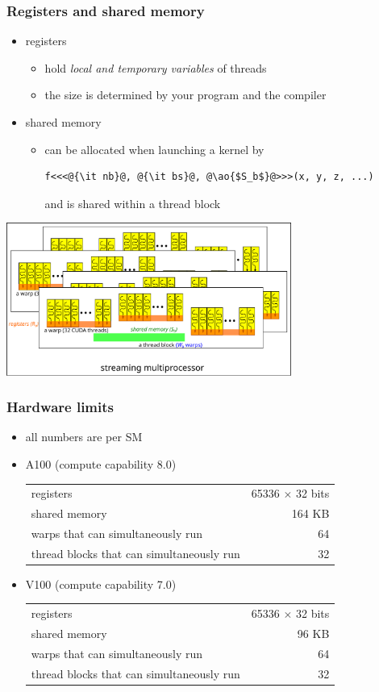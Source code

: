 \documentclass[12pt,dvipdfmx]{beamer}
\newcommand{\ao}[1]{{\color{blue}#1}}
\begin{document}
\begin{frame}[fragile]
  \frametitle{Registers and shared memory}
  \begin{itemize}
  \item registers
    \begin{itemize}
    \item hold \ao{\it local and temporary variables} of threads
    \item the size is determined by your program and the compiler
    \end{itemize}
  \item shared memory
    \begin{itemize}
    \item can be allocated when launching a kernel by
    \begin{lstlisting}
f<<<@{\it nb}@, @{\it bs}@, @\ao{$S_b$}@>>>(x, y, z, ...)
\end{lstlisting}
and is shared within a thread block
    \end{itemize}
  \end{itemize}
  \begin{center}
    \includegraphics[width=0.7\textwidth]{out/pdf/svg/warp_block_sm_5.pdf}
  \end{center}
\end{frame}

\begin{frame}
  \frametitle{Hardware limits}
  \begin{itemize}
  \item all numbers are per SM
  \item A100 (compute capability 8.0)
    \begin{tabular}{|l|r|}\hline
      registers & 65336 $\times$ 32 bits \\
      shared memory & 164 KB \\
      warps that can simultaneously run & 64 \\
      thread blocks that can simultaneously run & 32 \\\hline
    \end{tabular}
  \item V100 (compute capability 7.0)
    \begin{tabular}{|l|r|}\hline
      registers & 65336 $\times$ 32 bits \\
      shared memory & 96 KB \\
      warps that can simultaneously run & 64 \\
      thread blocks that can simultaneously run & 32 \\\hline
    \end{tabular}
  \end{itemize}
\end{frame}
\end{document}
